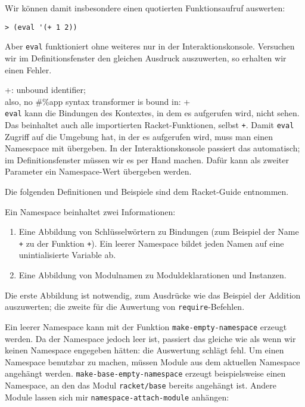 Wir können damit insbesondere einen quotierten Funktionsaufruf auswerten:

\begin{lstlisting}
> (eval '(+ 1 2))
\end{lstlisting}
{}

Aber \texttt{eval} funktioniert ohne weiteres nur in der Interaktionskonsole. Versuchen wir im Definitionsfenster den gleichen Ausdruck auszuwerten, so erhalten wir einen Fehler.

{\color{red}\ttfamily\small\hspace{5pt} +: unbound identifier;}\\
{\color{red}\ttfamily\small\hspace{5pt} also, no \#\%app syntax transformer is bound in: +}\\

\texttt{eval} kann die Bindungen des Kontextes, in dem es aufgerufen wird, nicht sehen. Das beinhaltet auch alle importierten Racket-Funktionen, selbst \texttt{+}. Damit \texttt{eval} Zugriff auf die Umgebung hat, in der es aufgerufen wird, muss man einen Namescpace mit übergeben. In der Interaktionskonsole passiert das automatisch; im Definitionsfenster müssen wir es per Hand machen. Dafür kann als zweiter Parameter ein Namespace-Wert übergeben werden. 

Die folgenden Definitionen und Beispiele sind dem Racket-Guide \cite{racketguide-namespace} entnommen.

Ein Namespace beinhaltet zwei Informationen:
\begin{enumerate}
 \item Eine Abbildung von Schlüsselwörtern zu Bindungen (zum Beispiel der Name \texttt{+} zu der Funktion \texttt{+}). Ein leerer Namespace bildet jeden Namen auf eine unintialisierte Variable ab.
 \item Eine Abbildung von Modulnamen zu Moduldeklarationen und Instanzen.
\end{enumerate}

Die erste Abbildung ist notwendig, zum Ausdrücke wie das Beispiel der Addition auszuwerten; die zweite für die Auwertung von \texttt{require}-Befehlen.

Ein leerer Namespace kann mit der Funktion \texttt{make-empty-namespace} erzeugt werden. Da der Namespace jedoch leer ist, passiert das gleiche wie als wenn wir keinen Namespace engegeben hätten: die Auswertung schlägt fehl. Um einen Namespace benutzbar zu machen, müssen Module aus dem aktuellen Namespace angehängt werden. \texttt{make-base-empty-namespace} erzeugt beispielsweise einen Namespace, an den das Modul \texttt{racket/base} bereits angehängt ist. Andere Module lassen sich mir \texttt{namespace-attach-module} anhängen:

